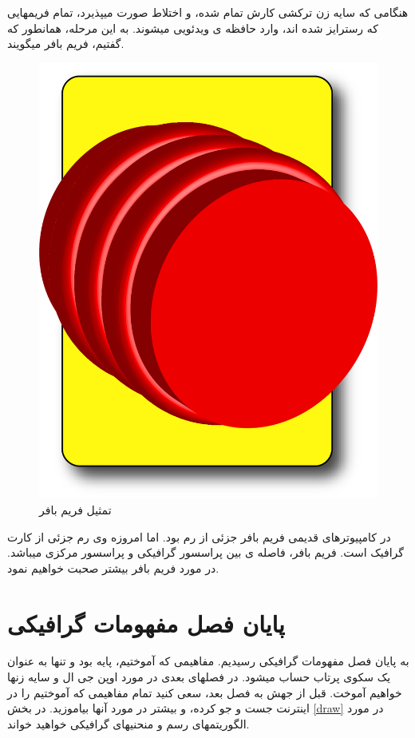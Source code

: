 \documentclass[14pt,a4paper]{memoir}
\begin{document}
 هنگامی که سایه زن ترکشی کارش تمام شده، و اختلاط صورت میپذیرد، تمام فریمهایی که رسترایز شده اند، وارد حافظه ی ویدئویی میشوند. به این مرحله، همانطور که گفتیم، فریم بافر میگویند.
 
 \begin{figure}[H]
\centering
\includegraphics[scale=0.9]{FrameBuffer}
\caption{تمثیل فریم بافر}
 \end{figure}
	 
	 
	 
	 
	 در کامپیوترهای قدیمی فریم بافر جزئی از رم بود. اما امروزه وی رم جزئی از کارت گرافیک است. فریم بافر، فاصله ی بین پراسسور گرافیکی و پراسسور مرکزی میباشد. در مورد فریم بافر بیشتر صحبت خواهیم نمود.
	 
	 
	 
	 \section{ پایان فصل مفهومات گرافیکی}
	 
	 به پایان فصل مفهومات گرافیکی رسیدیم. مفاهیمی که آموختیم، پایه بود و تنها به عنوان یک سکوی پرتاب حساب میشود. در فصلهای بعدی در مورد اوپن جی ال و سایه زنها خواهیم آموخت. قبل از جهش به فصل بعد، سعی کنید تمام مفاهیمی که آموختیم را در اینترنت جست و جو کرده، و بیشتر در مورد آنها بیاموزید. در بخش \ref{draw} در مورد الگوریتمهای رسم و منحنیهای گرافیکی خواهید خواند.
	 
\end{document}
